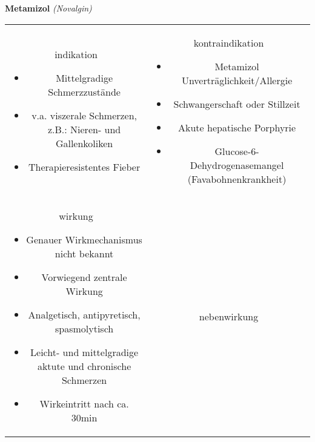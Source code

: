 \documentclass[12pt]{beamer}
\begin{document}
\begin{frame}{
    \textbf{Metamizol}
    \textit{(Novalgin)}
}
    \begin{tabular}{c c}
        \begin{beamercolorbox}[wd=\boxwidth\textwidth,ht=\boxheight\textheight,sep=1em]{indikation}
            \begin{itemize}
                \item Mittelgradige Schmerzzustände
                \item v.a. viszerale Schmerzen, z.B.: Nieren- und Gallenkoliken	
                \item Therapieresistentes Fieber
            \end{itemize}
        \end{beamercolorbox} & 
        \begin{beamercolorbox}[wd=\boxwidth\textwidth,ht=\boxheight\textheight,sep=1em]{kontraindikation}
            \scriptsize
            \begin{itemize}
                \item Metamizol Unverträglichkeit/Allergie
                \item Schwangerschaft oder Stillzeit
                \item Akute hepatische Porphyrie
                \item Glucose-6-Dehydrogenasemangel (Favabohnenkrankheit)
            \end{itemize}
        \end{beamercolorbox} \\
        \begin{beamercolorbox}[wd=\boxwidth\textwidth,ht=\boxheight\textheight,sep=1em]{wirkung}
            \scriptsize
            \begin{itemize}
                \item Genauer Wirkmechanismus nicht bekannt
                \item Vorwiegend zentrale Wirkung
                \item Analgetisch, antipyretisch, spasmolytisch
                \item Leicht- und mittelgradige aktute und chronische Schmerzen
                \item Wirkeintritt nach ca. 30min
            \end{itemize}
        \end{beamercolorbox} & 
        \begin{beamercolorbox}[wd=\boxwidth\textwidth,ht=\boxheight\textheight,sep=1em]{nebenwirkung}

\end{beamercolorbox}
\end{tabular}
\end{frame}
\end{document}
